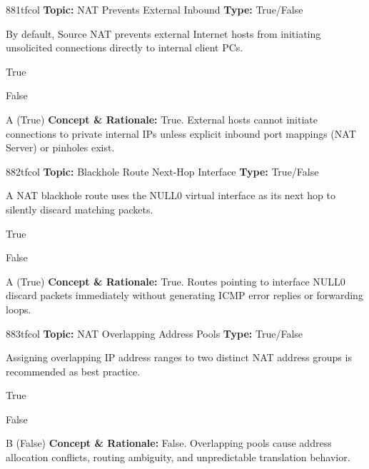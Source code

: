\begin{qcard}{881}{tfcol}
\textcolor{darkslate!75}{\small\textbf{Topic:} NAT Prevents External Inbound \hfill \textbf{Type:} True/False}\vspace{0.4em}\par
By default, Source NAT prevents external Internet hosts from initiating unsolicited connections directly to internal client PCs.
\begin{qoptions}
\item True
\item False
\end{qoptions}
\end{qcard}
\nopagebreak
\begin{explainbox}{A (True)}
\textbf{Concept \& Rationale:} True. External hosts cannot initiate connections to private internal IPs unless explicit inbound port mappings (NAT Server) or pinholes exist.
\end{explainbox}

\begin{qcard}{882}{tfcol}
\textcolor{darkslate!75}{\small\textbf{Topic:} Blackhole Route Next-Hop Interface \hfill \textbf{Type:} True/False}\vspace{0.4em}\par
A NAT blackhole route uses the NULL0 virtual interface as its next hop to silently discard matching packets.
\begin{qoptions}
\item True
\item False
\end{qoptions}
\end{qcard}
\nopagebreak
\begin{explainbox}{A (True)}
\textbf{Concept \& Rationale:} True. Routes pointing to interface NULL0 discard packets immediately without generating ICMP error replies or forwarding loops.
\end{explainbox}

\begin{qcard}{883}{tfcol}
\textcolor{darkslate!75}{\small\textbf{Topic:} NAT Overlapping Address Pools \hfill \textbf{Type:} True/False}\vspace{0.4em}\par
Assigning overlapping IP address ranges to two distinct NAT address groups is recommended as best practice.
\begin{qoptions}
\item True
\item False
\end{qoptions}
\end{qcard}
\nopagebreak
\begin{explainbox}{B (False)}
\textbf{Concept \& Rationale:} False. Overlapping pools cause address allocation conflicts, routing ambiguity, and unpredictable translation behavior.
\end{explainbox}

